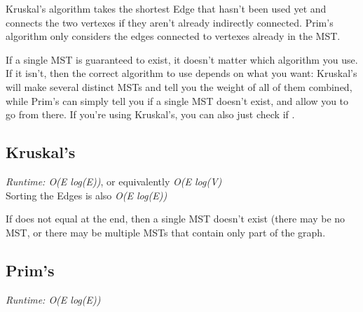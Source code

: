 
Kruskal's algorithm takes the shortest Edge that hasn't been used yet and connects the two vertexes if they aren't already indirectly connected. Prim's algorithm only considers the edges connected to vertexes already in the MST.

If a single MST is guaranteed to exist, it doesn't matter which algorithm you use. If it isn't, then the correct algorithm to use depends on what you want: Kruskal's will make several distinct MSTs and tell you the weight of all of them combined, while Prim's can simply tell you if a single MST doesn't exist, and allow you to go from there. If you're using Kruskal's, you can also just check if .

\subsection*{Kruskal's}

\textit{Runtime: O(E log(E))}, or equivalently \textit{O(E log(V)} \\
\indent Sorting the Edges is also \textit{O(E log(E))}

If  does not equal  at the end, then a single MST doesn't exist (there may be no MST, or there may be multiple MSTs that contain only part of the graph.



\subsection*{Prim's}

\textit{Runtime: O(E log(E))}



\newpage